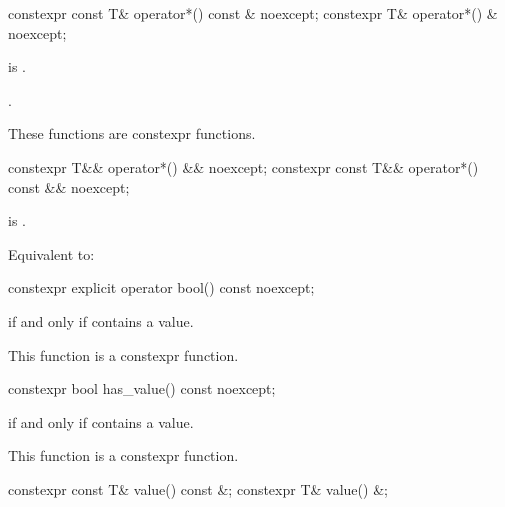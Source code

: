 %
\begin{itemdecl}
constexpr const T& operator*() const & noexcept;
constexpr T& operator*() & noexcept;
\end{itemdecl}

\begin{itemdescr}
\pnum
\hardexpects
{} is .

\pnum
\returns
{}.

\pnum
\remarks
These functions are constexpr functions.
\end{itemdescr}

%
\begin{itemdecl}
constexpr T&& operator*() && noexcept;
constexpr const T&& operator*() const && noexcept;
\end{itemdecl}

\begin{itemdescr}
\pnum
\hardexpects
{} is .

\pnum
\effects
Equivalent to: 
\end{itemdescr}

%
\begin{itemdecl}
constexpr explicit operator bool() const noexcept;
\end{itemdecl}

\begin{itemdescr}
\pnum
\returns
{} if and only if  contains a value.

\pnum
\remarks
This function is a constexpr function.
\end{itemdescr}

%
\begin{itemdecl}
constexpr bool has_value() const noexcept;
\end{itemdecl}

\begin{itemdescr}
\pnum
\returns
{} if and only if  contains a value.

\pnum
\remarks
This function is a constexpr function.
\end{itemdescr}

%
\begin{itemdecl}
constexpr const T& value() const &;
constexpr T& value() &;
\end{itemdecl}

